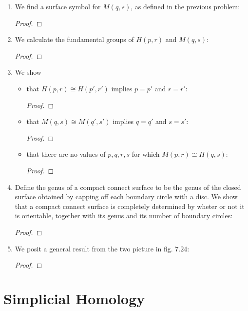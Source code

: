 \documentclass{book}
\begin{document}
\begin{enumerate}[(1)]
    \item We find a surface symbol for $M(q,s)$, as defined in the previous problem: 
        \begin{proof}
        \end{proof}

    \item We calculate the fundamental groups of $H(p,r)$ and $M(q,s)$: 
        \begin{proof}
        \end{proof}

    \item We show
        \begin{itemize}
            \item that $H(p,r) \cong H(p',r')$ implies $p = p'$ and $r = r'$: 
                \begin{proof}
                \end{proof}

            \item that $M(q,s) \cong M(q',s')$ implies $q = q'$ and $s = s'$: 
                \begin{proof}
                \end{proof}

            \item that there are no values of $p,q,r,s$ for which $M(p,r) \cong H(q,s)$: 
                \begin{proof}
                \end{proof}
        \end{itemize}

    \item Define the genus of a compact connect surface to be the genus of the closed surface obtained by capping off each boundary circle with a disc. We show that a compact connect surface is completely determined by wheter or not it is orientable, together with its genus and its number of boundary circles: 
        \begin{proof}
        \end{proof}

    \item We posit a general result from the two picture in fig. $7.24$: 
        \begin{proof}
        \end{proof}

\end{enumerate}

\chapter{Simplicial Homology}
\end{document}
